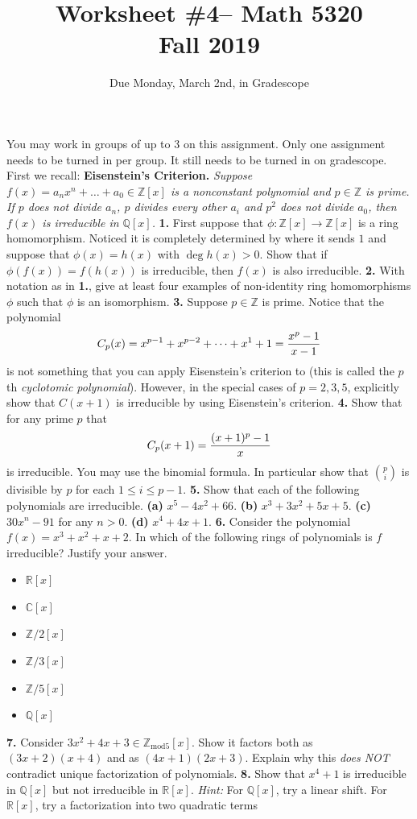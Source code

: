 \documentclass[10pt]{amsart}
\theoremstyle{theorem}
\renewcommand{\to}[1][]{\xrightarrow{\ #1\ }}
\newcommand{\bR}{{\mathbb{R}}}
\newcommand{\bQ}{\mathbb{Q}}
\newcommand{\bZ}{\mathbb{Z}}
\newcommand{\bC}{\mathbb{C}}
\begin{document}
\title{Worksheet \#4-- Math 5320\\Fall 2019}
\author{Due Monday, March 2nd, in Gradescope}

\maketitle
You may work in groups of up to 3 on this assignment.  Only one assignment needs to be turned in per group.  It still needs to be turned in on gradescope.  
\vskip 3pt
First we recall:
\vskip 3pt
\noindent
{\bf Eisenstein's Criterion.}  {\it Suppose $f(x) = a_n x^n + \dots + a_0 \in \bZ[x]$ is a nonconstant polynomial and $p \in \bZ$ is prime.  If $p$ does not divide $a_n$, $p$ divides every other $a_i$ and $p^2$ does not divide $a_0$, then $f(x)$ is irreducible in $\bQ[x]$.}
\vskip 3pt
\noindent
{\bf 1.}  First suppose that $\phi : \bZ[x] \to \bZ[x]$ is a ring homomorphism.  Noticed it is completely determined by where it sends $1$ and suppose that $\phi(x) = h(x)$ with $\deg h(x) > 0$.  Show that if $\phi(f(x)) = f(h(x))$ is irreducible, then $f(x)$ is also irreducible. 
\newpage
\noindent
{\bf 2.}  With notation as in {\bf 1.}, give at least four examples of non-identity ring homomorphisms $\phi$ such that $\phi$ is an isomorphism.
\vskip 150pt
\noindent
{\bf 3.}  Suppose $p \in \bZ$ is prime.  Notice that the polynomial 
\[
    C_p(x) = x^{p-1} + x^{p-2} + \dots + x^{1} + 1 = {x^p - 1 \over x-1} 
\]
is not something that you can apply Eisenstein's criterion to  (this is called the $p$th \emph{cyclotomic polynomial}).  However, in the special cases of $p = 2, 3, 5$, explicitly show that $C(x+1)$ is irreducible by using Eisenstein's criterion.  
\newpage
\noindent
{\bf 4.}  Show that for any prime $p$ that 
\[
    C_p(x+1) = {(x+1)^p - 1 \over x} 
\]
is irreducible.  You may use the binomial formula.  In particular show that ${p \choose i}$ is divisible by $p$ for each $1 \leq i \leq p-1$.
\newpage
\noindent
{\bf 5.}  Show that each of the following polynomials are irreducible.
\vskip 3pt
{\bf (a)}  $x^5 - 4x^2 + 66$.
\vskip 3pt
{\bf (b)}  $x^3 + 3x^2 + 5x + 5$.
\vskip 3pt
{\bf (c)}  $30 x^n - 91$ for any $n > 0$.  
\vskip 3pt
{\bf (d)}  $x^4 + 4x + 1$.
\newpage
\noindent
{\bf 6.}  Consider the polynomial $f(x) = x^3 + x^2 + x + 2$.  In which of the following rings of polynomials is $f$ irreducible?  Justify your answer.
\begin{itemize}
\item[(a)]  $\bR[x]$
\item[(b)]  $\bC[x]$
\item[(c)]  $\bZ/{2}[x]$
\item[(d)]  $\bZ/{3}[x]$
\item[(e)]  $\bZ/{5}[x]$
\item[(f)]  $\bQ[x]$
\end{itemize}
\newpage
\noindent
{\bf 7.}  Consider $3x^2 + 4x + 3 \in \mathbb{Z}_{\text{mod} 5}[x]$.  Show it factors both as $(3x + 2)(x+4)$ and as $(4x + 1)(2x+3)$.  Explain why this \emph{does NOT} contradict unique factorization of polynomials.
\vskip 250pt
\noindent
{\bf 8.}  Show that $x^4 + 1$ is irreducible in $\bQ[x]$ but not irreducible in $\bR[x]$.
\vskip 3pt
\emph{Hint: } For $\bQ[x]$, try a linear shift.  For $\bR[x]$, try a factorization into two quadratic terms
\end{document}
